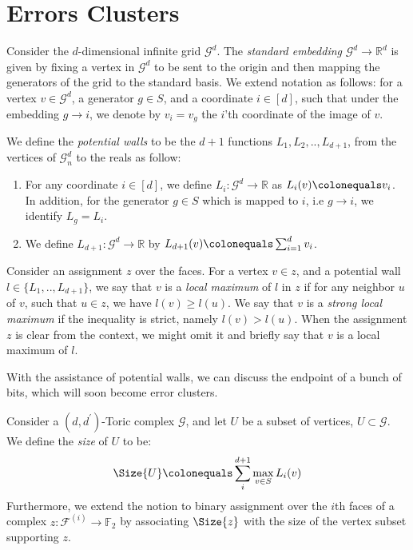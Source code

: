 \section{Errors Clusters}

\begin{definition}
  Consider the $d$-dimensional infinite grid $\mathcal{G}^{d}$. The \textit{standard embedding} $\mathcal{G}^{d} \rightarrow \mathbb{R}^{d}$ is given by fixing a vertex in $\mathcal{G}^{d}$ to be sent to the origin and then mapping the generators of the grid to the standard basis. We extend notation as follows: for a vertex $v \in \mathcal{G}^{d}$, a generator $g \in S$, and a coordinate $i \in [d]$, such that under the embedding $g \rightarrow i$, we denote by $v_{i} = v_{g}$ the $i$'th coordinate of the image of $v$.
\end{definition}

\begin{definition}
  We define the \textit{potential walls} to be the $d+1$ functions $L_{1},L_{2},..,L_{d+1}$, from the vertices of $\mathcal{G}_{n}^{d}$ to the reals as follow:
  \begin{enumerate}
    \item For any coordinate $i \in [d]$, we define $L_{i} \colon \mathcal{G}^{d} \rightarrow \mathbb{R}$ as $L_{i}(v) \colonequals v_{i}$. In addition, for the generator $g \in S$ which is mapped to $i$, i.e $g \rightarrow i $, we identify $L_{g} = L_{i}$. 
    \item We define $L_{d+1} \colon \mathcal{G}^{d} \rightarrow \mathbb{R}$ by $L_{d+1}(v) \colonequals \sum_{i = 1}^{d}v_{i}$.
  \end{enumerate}
  Consider an assignment $z$ over the faces. For a vertex $v \in z$, and a potential wall $l \in \{ L_{1},..,L_{d+1}\} $, we say that $v$ is a \textit{local maximum} of $l$ in $z$ if for any neighbor $u$ of $v$, such that $u \in z$, we have $l(v) \ge l(u)$. We say that $v$ is a \textit{strong local maximum} if the inequality is strict, namely $l(v) > l(u)$. When the assignment $z$ is clear from the context, we might omit it and briefly say that $v$ is a local maximum of $l$.

\end{definition}
With the assistance of potential walls, we can discuss the endpoint of a bunch of bits, which will soon become error clusters. 

\begin{definition}
Consider a $(d,d^{\prime})$-Toric complex $\mathcal{G}$, and let $U$ be a subset of vertices, $U \subset \mathcal{G}$. We define the \textit{size} of $U$ to be:
  \begin{equation*}
    \begin{split}
      \Size{U} \colonequals \sum_{i}^{d+1} \max_{v \in S} L_{i}(v) 
    \end{split}
  \end{equation*}
Furthermore, we extend the notion to binary assignment over the $i$th faces of a complex $z : \mathcal{F}^{(i)} \rightarrow \mathbb{F}_{2}$ by associating $\Size{z}$ with the size of the vertex subset supporting $z$.
\end{definition}

